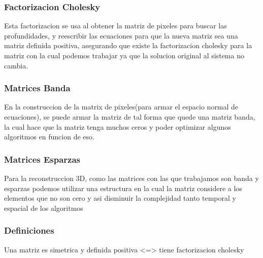 \subsubsection{Factorizacion Cholesky}
Esta factorizacion se usa al obtener la matriz de pixeles para buscar las profundidades, y reescribir las ecuaciones para que la nueva matriz sea una matriz definida positiva, asegurando que existe la factorizacion cholesky para la matriz con la cual podemos trabajar ya que la solucion original al sistema no cambia.

\subsubsection{Matrices Banda}
En la construccion de la matrix de pixeles(para armar el espacio normal de ecuaciones), se puede armar la matriz de tal forma que quede una matriz banda, la cual hace que la matriz tenga muchos ceros y poder optimizar algunos algoritmos en funcion de eso.


\subsubsection{Matrices Esparzas}
Para la reconstruccion 3D, como las matrices con las que trabajamos son banda y esparzas podemos utilizar una estructura en la cual la matriz considere a los elementos que no son cero y asi disminuir la complejidad tanto temporal y espacial de los algoritmos 

\subsubsection{Definiciones}
Una matriz es simetrica y definida positiva <=> tiene factorizacion cholesky

